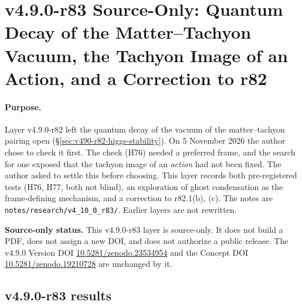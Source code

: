 
\clearpage
\section*{v4.9.0-r83 Source-Only: Quantum Decay of the Matter--Tachyon Vacuum, the Tachyon Image of an Action, and a Correction to r82}
\label{sec:v490-r83-vacuum-decay-image}

\paragraph{Purpose.}
Layer v4.9.0-r82 left the quantum decay of the vacuum of the matter--tachyon pairing open
(\S\ref{sec:v490-r82-higgs-stability}).  On 5 November 2026 the author chose to check it first.  The check (H76) needed a preferred
frame, and the search for one exposed that the tachyon image of an \emph{action} had not been fixed.  The author asked to settle this
before choosing.  This layer records both pre-registered tests (H76, H77, both not blind), an exploration of ghost condensation as the
frame-defining mechanism, and a correction to r82.1(b), (c).  The notes are \texttt{notes/\allowbreak research/\allowbreak v4\_10\_0\_r83/}.
Earlier layers are not rewritten.

\noindent\textbf{Source-only status.}
This v4.9.0-r83 layer is source-only.  It does not build a PDF, does not assign a new DOI,
and does not authorize a public release.  The v4.9.0 Version DOI
\href{https://doi.org/10.5281/zenodo.23534954}{10.5281/zenodo.23534954} and the Concept DOI
\href{https://doi.org/10.5281/zenodo.19210728}{10.5281/zenodo.19210728} are unchanged by it.

\subsection*{v4.9.0-r83 results}
\label{subsec:v490-r83-results}

